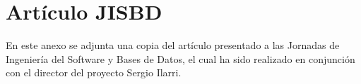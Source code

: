 \chapter{Artículo JISBD}

En este anexo se adjunta una copia del artículo presentado a las Jornadas de Ingeniería del Software y Bases de Datos, el cual ha sido realizado en conjunción con el director del proyecto Sergio Ilarri.




